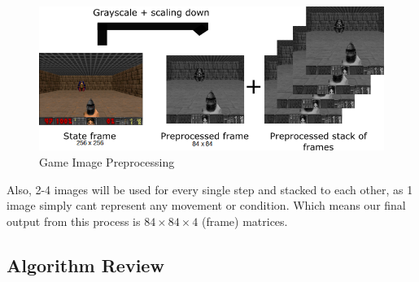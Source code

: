     \begin{figure}[H]
        \centering
        \includegraphics[scale=0.5]{images/preprocessing.png}
        \caption{Game Image Preprocessing}
        \label{fig:44}
    \end{figure}
    
    Also, 2-4 images will be used for every single step and stacked to each other, as 1 image simply cant represent any movement or condition. Which means our final output from this process is  $84 \times 84 \times 4$ (frame)  matrices.
    
    \subsection{Algorithm Review}


